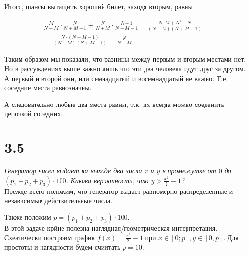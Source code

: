 \documentclass[a4paper,12pt]{article}
\begin{document}
Итого, шансы вытащить хороший билет, заходя вторым, равны

\begin{gather*}
\frac{M}{N + M} \cdot \frac{N}{N + M - 1} + \frac{N}{N + M} \cdot \frac{N - 1}{N + M - 1} = \frac{N \cdot M + N^2 - N}{(N + M)(N + M -1)} =\\
= \frac{N \cdot (N + M - 1)}{(N + M)(N + M - 1)} = \frac{N}{N + M}
\end{gather*}

Таким образом мы показали, что разницы между первым и вторым местами нет.
Но в рассуждениях выше важно лишь что эти два человека идут друг за другом.
А первый и второй они, или семнадцатый и восемнадцатый не важно.
Т.е. соседние места равнозначны.

А следовательно любые два места равны, т.к. их всегда можно соеденить цепочкой соседних.




\section*{3.5}

\textit{Генератор чисел выдает на выходе два числа $x$ и $y$ в промежутке от $0$ до $(p_1 + p_2 + p_3) \cdot 100$.
Какова вероятность, что $y > \frac{x^2}{2} - 1$?}
\\

Прежде всего положим, что генератор выдает равномерно распределенные и независимые действительные числа.

Также положим $p = (p_1 + p_2 + p_3) \cdot 100$.
\\

В этой задаче крйне полезна наглядная/геометрическая интерпретация.
Схеатически построим график $f(x) = \frac{x^2}{2} - 1$ при $x \in [0; p], y \in [0, p]$.
Для простоты и нагядности будем счиитать $p = 10$.

\begin{center}
\end{center}
\end{document}
